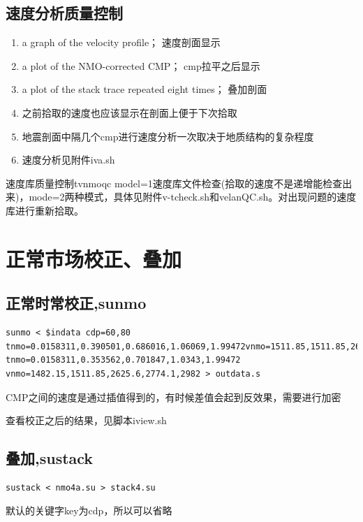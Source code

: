 \subsection{速度分析质量控制}
\begin{enumerate}
	\item a graph of the velocity profile；	速度剖面显示
	\item a plot of the NMO-corrected CMP；	cmp拉平之后显示
	\item a plot of the stack trace repeated eight times；	叠加剖面
	\item 之前拾取的速度也应该显示在剖面上便于下次拾取
	\item 地震剖面中隔几个cmp进行速度分析一次取决于地质结构的复杂程度
	\item 速度分析见附件iva.sh
\end{enumerate}\par
速度库质量控制tvnmoqc model=1速度库文件检查(拾取的速度不是递增能检查出来)，mode=2两种模式，具体见附件v-tcheck.sh和velanQC.sh。对出现问题的速度库进行重新拾取。
\section{正常市场校正、叠加}
\subsection{正常时常校正,sunmo}
\begin{lstlisting}
sunmo < $indata cdp=60,80 tnmo=0.0158311,0.390501,0.686016,1.06069,1.99472vnmo=1511.85,1511.85,2640.45,2922.6,3249.3 tnmo=0.0158311,0.353562,0.701847,1.0343,1.99472 vnmo=1482.15,1511.85,2625.6,2774.1,2982 > outdata.s
\end{lstlisting}\par
CMP之间的速度是通过插值得到的，有时候差值会起到反效果，需要进行加密\par
查看校正之后的结果，见脚本iview.sh
\subsection{叠加,sustack}
\begin{lstlisting}
sustack < nmo4a.su > stack4.su
\end{lstlisting}\par
默认的关键字key为cdp，所以可以省略

